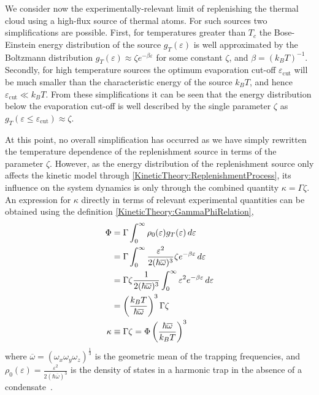 We consider now the experimentally-relevant limit of replenishing the thermal cloud using a high-flux source of thermal atoms. For such sources two simplifications are possible. First, for temperatures greater than $T_c$ the Bose-Einstein energy distribution of the source $g_T(\varepsilon)$ is well approximated by the Boltzmann distribution $g_T(\varepsilon) \approx \zeta e^{-\beta \varepsilon}$ for some constant $\zeta$, and $\beta = \left(k_B T\right)^{-1}$. Secondly, for high temperature sources the optimum evaporation cut-off $\varepsilon_\text{cut}$ will be much smaller than the characteristic energy of the source $k_B T$, and hence $\varepsilon_\text{cut} \ll k_B T$.  From these simplifications it can be seen that the energy distribution below the evaporation cut-off is well described by the single parameter $\zeta$ as $g_T(\varepsilon \leq \varepsilon_\text{cut}) \approx \zeta$.

At this point, no overall simplification has occurred as we have simply rewritten the temperature dependence of the replenishment source in terms of the parameter $\zeta$.  However, as the energy distribution of the replenishment source only affects the kinetic model through \eqref{KineticTheory:ReplenishmentProcess}, its influence on the system dynamics is only through the combined quantity $\kappa = \Gamma \zeta$. An expression for $\kappa$ directly in terms of relevant experimental quantities can be obtained using the definition \eqref{KineticTheory:GammaPhiRelation},
\begin{align}
    \Phi &= \Gamma \int_0^\infty \rho_0(\varepsilon) g_T(\varepsilon)\, d\varepsilon \notag\\
    &= \Gamma \int_0^\infty \frac{\varepsilon^2}{2 (\hbar \overline{\omega})^3} \zeta e^{-\beta \varepsilon}\, d\varepsilon \notag\\
    &= \Gamma \zeta \frac{1}{2 (\hbar \overline{\omega})^3} \int_0^\infty \varepsilon^2 e^{-\beta \varepsilon}\, d\varepsilon \notag\\
    &= \left(\frac{k_B T}{\hbar \overline{\omega}}\right)^3 \Gamma \zeta\\
    \kappa &\equiv \Gamma \zeta = \Phi \left(\frac{\hbar \overline{\omega}}{k_B T}\right)^3 \label{KineticTheory:KappaDefinition}
\end{align}
where $\overline{\omega} = \left(\omega_x \omega_y \omega_z\right)^{\frac{1}{3}}$ is the geometric mean of the trapping frequencies, and $\displaystyle\rho_0(\varepsilon) = \frac{\varepsilon^2}{2 (\hbar \overline{\omega})^3}$ is the density of states in a harmonic trap in the absence of a condensate~\citep{PethickSmith}.

